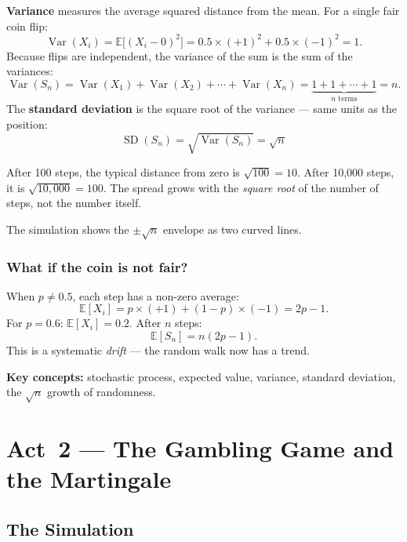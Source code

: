 \documentclass[12pt, a4paper]{article}
\newcommand{\E}{\mathbb{E}}            %
\newcommand{\Var}{\operatorname{Var}}
\newcommand{\SD}{\operatorname{SD}}
\begin{document}
\textbf{Variance} measures the average squared distance from the mean.
For a single fair coin flip:
\[
  \Var(X_i) = \E\bigl[(X_i - 0)^2\bigr]
  = 0.5 \times (+1)^2 + 0.5 \times (-1)^2
  = 1.
\]
Because flips are independent, the variance of the sum is the sum of
the variances:
\[
  \Var(S_n) = \Var(X_1) + \Var(X_2) + \cdots + \Var(X_n)
  = \underbrace{1 + 1 + \cdots + 1}_{n\text{ terms}} = n.
\]
The \textbf{standard deviation} is the square root of the variance ---
same units as the position:
\[
  \boxed{\SD(S_n) = \sqrt{\Var(S_n)} = \sqrt{n}}
\]

\begin{plainlanguage}
After 100 steps, the typical distance from zero is $\sqrt{100}=10$.
After 10,000 steps, it is $\sqrt{10{,}000}=100$.  The spread grows with the
\emph{square root} of the number of steps, not the number itself.
\end{plainlanguage}

The simulation shows the $\pm\sqrt{n}$ envelope as two curved lines.

\subsubsection*{What if the coin is not fair?}

When $p \neq 0.5$, each step has a non-zero average:
\[
  \E[X_i] = p \times (+1) + (1-p) \times (-1) = 2p - 1.
\]
For $p = 0.6$: $\E[X_i] = 0.2$.  After $n$ steps:
\[
  \E[S_n] = n(2p-1).
\]
This is a systematic \emph{drift} --- the random walk now has a trend.

\begin{keytakeaway}
\textbf{Key concepts:} stochastic process, expected value, variance, standard
deviation, the $\sqrt{n}$ growth of randomness.
\end{keytakeaway}


\newpage
\section{Act~2 --- The Gambling Game and the Martingale}

\subsection{The Simulation}
\end{document}
